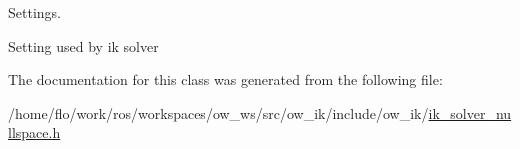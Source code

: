 Settings. 

Setting used by ik solver 

The documentation for this class was generated from the following file\+:\begin{DoxyCompactItemize}
\item 
/home/flo/work/ros/workspaces/ow\+\_\+ws/src/ow\+\_\+ik/include/ow\+\_\+ik/\hyperlink{ik__solver__nullspace_8h}{ik\+\_\+solver\+\_\+nullspace.\+h}\end{DoxyCompactItemize}

